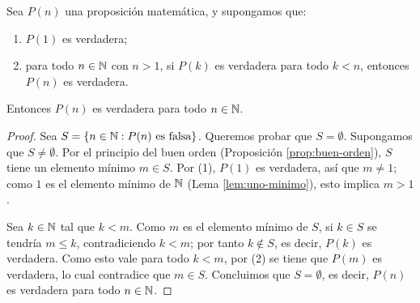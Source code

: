 \documentclass[12pt,a4paper]{book}
\begin{document}
    \begin{proposicion}
        \label{prop:induccion-orden}
        Sea $P(n)$ una proposición matemática, y supongamos que:
        \begin{enumerate}[label=(\arabic*)]
            \item $P(1)$ es verdadera;
            \item para todo $n\in\mathbb{N}$ con $n>1$, si $P(k)$ es verdadera para todo $k<n$, entonces $P(n)$ es verdadera.
        \end{enumerate}
        Entonces $P(n)$ es verdadera para todo $n\in\mathbb{N}$.
    \end{proposicion}
    \begin{proof}
        Sea $S=\{n\in\mathbb{N} : P(n) \text{ es falsa}\}$. Queremos probar que $S=\emptyset$. Supongamos que $S\neq\emptyset$. Por el principio del buen orden (Proposición \ref{prop:buen-orden}), $S$ tiene un elemento mínimo $m\in S$. Por (1), $P(1)$ es verdadera, así que $m\neq1$; como $1$ es el elemento mínimo de $\mathbb{N}$ (Lema \ref{lem:uno-minimo}), esto implica $m>1$.

        Sea $k\in\mathbb{N}$ tal que $k<m$. Como $m$ es el elemento mínimo de $S$, si $k\in S$ se tendría $m\le k$, contradiciendo $k<m$; por tanto $k\notin S$, es decir, $P(k)$ es verdadera. Como esto vale para todo $k<m$, por (2) se tiene que $P(m)$ es verdadera, lo cual contradice que $m\in S$. Concluimos que $S=\emptyset$, es decir, $P(n)$ es verdadera para todo $n\in\mathbb{N}$.
    \end{proof}
\end{document}
